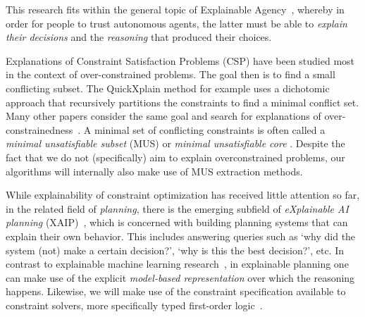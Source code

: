 This research fits within the general topic of Explainable Agency~\cite{langley2017explainable}, whereby in order for people to trust autonomous agents, the latter must be able to \textit{explain their decisions} and the \textit{reasoning} that produced their choices.



Explanations of Constraint Satisfaction Problems (CSP) have been studied most in the context of over-constrained problems.
The goal then is to find a small conflicting subset.
The QuickXplain method \cite{junker2001quickxplain} for example uses a dichotomic approach that recursively partitions the constraints to find a minimal conflict set. Many other papers consider the same goal and search for explanations of over-constrainedness~\cite{leo2017debugging,zeighami2018towards}.
A minimal set of conflicting constraints is often called a \emph{minimal unsatisfiable subset} (MUS) or \emph{minimal unsatisfiable core} \cite{marques2010minimal}. Despite the fact that we do not (specifically) aim to explain overconstrained problems, our algorithms will internally also make use of MUS extraction methods.


While explainability of constraint optimization has received little attention so far, in the related field of \textit{planning}, there is the emerging subfield of \textit{eXplainable AI planning} (XAIP)~\cite{fox2017explainable}, which is concerned with building planning systems that can explain their own behavior. This includes answering queries such as `why did the system (not) make a certain decision?', `why is this the best decision?', etc. In contrast to explainable machine learning research~\cite{guidotti2018survey}, in explainable planning one can make use of the explicit \textit{model-based representation} over which the reasoning happens. Likewise, we will make use of the constraint specification available to constraint solvers, more specifically typed first-order logic~\cite{atcl/Wittocx13}.

% 
% 

